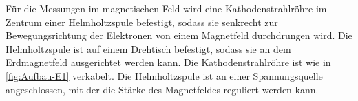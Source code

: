 \noindent Für die Messungen im magnetischen Feld wird eine Kathodenstrahlröhre im Zentrum einer Helmholtzspule befestigt, sodass sie senkrecht zur Bewegungsrichtung der Elektronen von einem Magnetfeld durchdrungen wird. Die Helmholtzspule ist auf einem Drehtisch befestigt, sodass sie an dem Erdmagnetfeld ausgerichtet werden kann. Die Kathodenstrahlröhre ist wie in \ref{fig:Aufbau-E1} verkabelt. Die Helmholtzspule ist an einer Spannungsquelle angeschlossen, mit der die Stärke des Magnetfeldes reguliert werden kann.